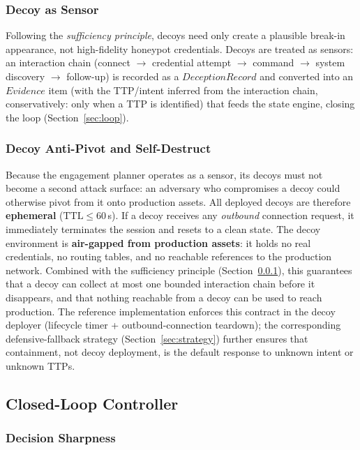 \documentclass[preprints,article,accept,oneauthor]{Definitions/mdpi}
\begin{document}
\subsubsection{Decoy as Sensor}
\label{sec:decoy-mapping}

Following the \textit{sufficiency principle}, decoys need only create a
plausible break-in appearance, not high-fidelity honeypot credentials.
Decoys are treated as sensors: an interaction chain (connect $\to$
credential attempt $\to$ command $\to$ system discovery $\to$ follow-up) is
recorded as a $\mathit{DeceptionRecord}$ and converted into an
$\mathit{Evidence}$ item (with the TTP/intent inferred from the interaction
chain, conservatively: only when a TTP is identified) that feeds the state
engine, closing the loop (Section~\ref{sec:loop}).

\subsubsection{Decoy Anti-Pivot and Self-Destruct}
\label{sec:anti-pivot}

Because the engagement planner operates as a sensor, its decoys must not
become a second attack surface: an adversary who compromises a decoy could
otherwise pivot from it onto production assets. All deployed decoys are
therefore \textbf{ephemeral} ($\mathrm{TTL} \leq 60$\,s). If a decoy
receives any \textit{outbound} connection request, it immediately terminates
the session and resets to a clean state. The decoy environment is
\textbf{air-gapped from production assets}: it holds no real credentials, no
routing tables, and no reachable references to the production network.
Combined with the sufficiency principle (Section~\ref{sec:decoy-mapping}), this
guarantees that a decoy can collect at most one bounded interaction chain
before it disappears, and that nothing reachable from a decoy can be used to
reach production. The reference implementation enforces this contract in the
decoy deployer (lifecycle timer + outbound-connection teardown); the
corresponding defensive-fallback strategy (Section~\ref{sec:strategy}) further
ensures that containment, not decoy deployment, is the default response to
unknown intent or unknown TTPs.

\subsection{Closed-Loop Controller}
\label{sec:controller}

\subsubsection{Decision Sharpness}
\label{sec:sharpness-formal}
\end{document}
